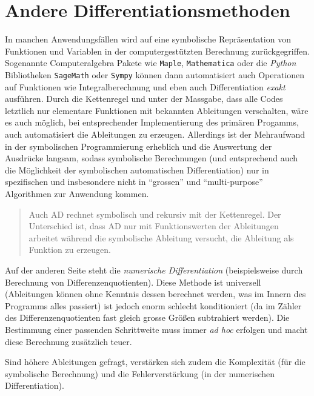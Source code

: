 \documentclass[
]{book}
\newenvironment {JHSAYS} [0] {\begin{quote}\color{jhsc}} {\end{quote}}
\theoremstyle{definition}
\theoremstyle{definition}
\theoremstyle{definition}
\theoremstyle{definition}
\theoremstyle{remark}
\begin{document}
\hypertarget{andere-differentiationsmethoden}{%
\section{Andere Differentiationsmethoden}\label{andere-differentiationsmethoden}}

In manchen Anwendungsfällen wird auf eine symbolische Repräsentation von
Funktionen und Variablen in der computergestützten Berechnung
zurückgegriffen. Sogenannte Computeralgebra Pakete wie \texttt{Maple},
\texttt{Mathematica} oder die \emph{Python} Bibliotheken \texttt{SageMath} oder \texttt{Sympy} können
dann automatisiert auch Operationen auf Funktionen wie Integralberechnung und
eben auch Differentiation \emph{exakt} ausführen. Durch die Kettenregel und
unter der Massgabe, dass alle Codes letztlich nur elementare Funktionen mit
bekannten Ableitungen verschalten, wäre es auch möglich, bei
entsprechender Implementierung des primären Progamms, auch automatisiert
die Ableitungen zu erzeugen. Allerdings ist der Mehraufwand in der symbolischen
Programmierung erheblich und die Auswertung der Ausdrücke langsam, sodass
symbolische Berechnungen (und entsprechend auch die Möglichkeit der
symbolischen automatischen Differentiation) nur in spezifischen und insbesondere
nicht in ``grossen'' und ``multi-purpose'' Algorithmen zur Anwendung kommen.

\leavevmode{}%
\begin{JHSAYS}
Auch AD rechnet symbolisch und rekursiv mit der Kettenregel. Der Unterschied ist, dass AD nur mit Funktionswerten der
Ableitungen arbeitet während die symbolische Ableitung versucht, die
Ableitung als Funktion zu erzeugen.

\end{JHSAYS}

Auf der anderen Seite steht die \emph{numerische Differentiation} (beispielsweise durch Berechnung von Differenzenquotienten).
Diese Methode ist universell (Ableitungen können ohne Kenntnis dessen
berechnet werden, was im Innern des Programms alles passiert) ist jedoch enorm schlecht konditioniert (da im
Zähler des Differenzenquotienten fast gleich grosse Größen
subtrahiert werden). Die Bestimmung einer passenden Schrittweite muss immer \emph{ad
hoc} erfolgen und macht diese Berechnung zusätzlich teuer.

Sind höhere Ableitungen gefragt, verstärken sich zudem die
Komplexität (für die symbolische Berechnung) und die Fehlerverstärkung (in der numerischen Differentiation).
\end{document}
